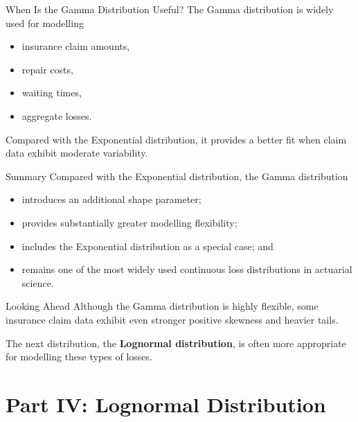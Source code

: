 \documentclass[
  ignorenonframetext,
  aspectratio=169,
]{beamer}
\providecommand{\tightlist}{%
  \setlength{\itemsep}{0pt}\setlength{\parskip}{0pt}}
\begin{document}
\begin{frame}{When Is the Gamma Distribution Useful?}
\protect{}\label{when-is-the-gamma-distribution-useful}
The Gamma distribution is widely used for modelling

\begin{itemize}
\tightlist
\item
  insurance claim amounts,
\item
  repair costs,
\item
  waiting times,
\item
  aggregate losses.
\end{itemize}

Compared with the Exponential distribution, it provides a better fit
when claim data exhibit moderate variability.
\end{frame}

\begin{frame}{Summary}
\protect{}\label{summary}
Compared with the Exponential distribution, the Gamma distribution

\begin{itemize}
\tightlist
\item
  introduces an additional shape parameter;
\item
  provides substantially greater modelling flexibility;
\item
  includes the Exponential distribution as a special case; and
\item
  remains one of the most widely used continuous loss distributions in
  actuarial science.
\end{itemize}
\end{frame}

\begin{frame}{Looking Ahead}
\protect{}\label{looking-ahead-1}
Although the Gamma distribution is highly flexible, some insurance claim
data exhibit even stronger positive skewness and heavier tails.

The next distribution, the \textbf{Lognormal distribution}, is often
more appropriate for modelling these types of losses.
\end{frame}

\section{Part IV: Lognormal
Distribution}\label{part-iv-lognormal-distribution}
\end{document}
